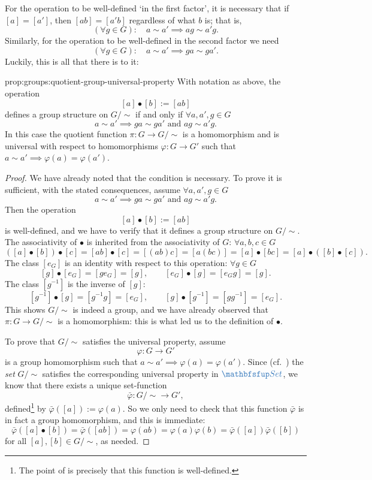 For the operation to be well-defined `in the first factor', it is
necessary that if $[a] = [a']$, then $[ab] = [a'b]$ regardless of what
$b$ is; that is,
\[
  (\forall g \in G) : \quad a \sim a' \implies ag \sim a'g.
\]
Similarly, for the operation to be well-defined in the second factor
we need
\[
  (\forall g \in G) : \quad a \sim a' \implies ga \sim ga'.
\]
Luckily, this is all that there is to it:

\begin{prop}{}{prop:groups:quotient-group-universal-property}
  With notation as above, the operation
    \[ [a] \bullet [b] := [ab]
\]
defines a group structure on $G/\!\sim$ if and only if
$\forall a, a', g \in G$
\[
  a \sim a' \implies ga \sim ga' \text{ and } ag \sim a'g.
\]
In this case the quotient function $\pi : G \to G/\!\sim$ is a
homomorphism and is universal with respect to homomorphisms
$\varphi : G \to G'$ such that
$a \sim a' \implies \varphi(a) =
\varphi(a')$.
\end{prop}
\begin{proof}
  We have already noted that the condition is necessary. To prove it
  is sufficient, with the stated consequences, assume
  $\forall a, a', g \in G$
  \[
    a \sim a' \implies ga \sim ga' \text{ and } ag \sim a'g.
  \]
  Then the operation
  \[ [a] \bullet [b] := [ab]
  \]
  is well-defined, and we have to verify that it defines a group
  structure on $G/\!\sim$. The associativity of $\bullet$ is inherited
  from the associativity of $G$: $\forall a,b,c \in G$
  \[
    ([a] \bullet [b]) \bullet [c] = [ab] \bullet [c] = [(ab)c] =
    [a(bc)] = [a] \bullet [bc] = [a] \bullet ([b] \bullet [c]).
  \]
  The class $[e_G]$ is an identity with respect to this operation:
  $\forall g \in G$
  \[ [g] \bullet [e_G] = [ge_G] = [g], \qquad [e_G] \bullet [g] =
    [e_Gg] = [g].
  \]
  The class $[g^{-1}]$ is the inverse of $[g]$:
  \[ [g^{-1}] \bullet [g] = [g^{-1}g] = [e_G], \qquad [g] \bullet
    [g^{-1}] = [gg^{-1}] = [e_G].
  \]
  This shows $G/\!\sim$ is indeed a group, and we have already
  observed that $\pi : G \to G/\!\sim$ is a homomorphism: this is what
  led us to the definition of $\bullet$.

  To prove that $G/\!\sim$ satisfies the universal property, assume
  \[
    \varphi : G \to G'
  \]
  is a group homomorphism such that
  $a \sim a' \implies \varphi(a) = \varphi(a')$. Since (cf.\
  ) the \emph{set} $G/\!\sim$
  satisfies the corresponding universal property in $\categ{Set}$, we
  know that there exists a unique set-function
  \[
    \bar\varphi : G/\!\sim \to G',
  \]
  defined\footnote{The point of  is
    precisely that this function is well-defined.} by
  $\bar\varphi([a]) := \varphi(a)$. So we only need to check that this
  function $\bar\varphi$ is in fact a group homomorphism, and this is
  immediate:
  \[
    \bar\varphi([a] \bullet [b]) = \bar\varphi([ab]) = \varphi(ab) =
    \varphi(a)\varphi(b) = \bar\varphi([a])\bar\varphi([b])
  \]
  for all $[a], [b] \in G/\!\sim$, as needed.
\end{proof}

